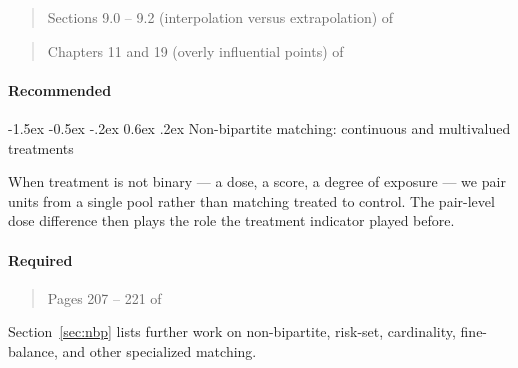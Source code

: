 \documentclass[12pt]{article}
\makeatletter
\renewcommand\subsection{\@startsection{subsection}{2}{\z@}%
  {-1.5ex \@plus -0.5ex \@minus -.2ex}%
  {0.6ex \@plus .2ex}%
  {\normalfont\large\bfseries}}
\makeatother
\begin{document}
\begin{verse} Sections 9.0 -- 9.2 (interpolation versus extrapolation) of  \end{verse}

\begin{verse}  \end{verse}

\begin{verse} Chapters 11 and 19 (overly influential points) of  \end{verse}

\paragraph*{Recommended}

\begin{verse}  \end{verse}

\begin{verse}  \end{verse}

\subsection{Non-bipartite matching: continuous and multivalued treatments}

When treatment is not binary --- a dose, a score, a degree of exposure --- we pair units from a single pool rather than matching treated to control. The pair-level dose difference then plays the role the treatment indicator played before.

\paragraph*{Required}

\begin{verse}  \end{verse}

\begin{verse}  \end{verse}

\begin{verse} Pages 207 -- 221 of  \end{verse}

Section~\ref{sec:nbp} lists further work on non-bipartite, risk-set, cardinality, fine-balance, and other specialized matching.
\end{document}
